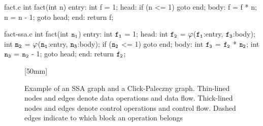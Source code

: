 \begin{filecontents*}{fact.c}
int fact(int n) {
  entry:
    int f = 1;
  head:
    if (n <= 1) goto end;
  body:
    f = f * n;
    n = n - 1;
    goto head;
  end:
    return f;
}
\end{filecontents*}

\begin{filecontents*}{fact-ssa.c}
int fact(int $\irVar{n}[1]$) {
  entry:
    int $\irVar{f}[1]$ = 1;
  head:
    int $\irVar{f}[2]$ = $\mPhi$($\irVar{f}[1]$:entry, $\irVar{f}[3]$:body);
    int $\irVar{n}[2]$ = $\mPhi$($\irVar{n}[1]$:entry, $\irVar{n}[3]$:body);
    if ($\irVar{n}[2]$ <= 1) goto end;
  body:
    int $\irVar{f}[3]$ = $\irVar{f}[2]$ * $\irVar{n}[2]$;
    int $\irVar{n}[3]$ = $\irVar{n}[2]$ - 1;
    goto head;
  end:
    return $\irVar{f}[2]$;
}
\end{filecontents*}

\begin{figure}
  \centering%
  \mbox{}%
  \hfill%
                [50mm]%
                {}%
  \hfill%
                {}%
  \hfill%
  \mbox{}

  \vspace*{\betweensubfigures}

                {%
                }

  \vspace*{\betweensubfigures}


  \caption[%
            Example of an SSA graph and a Click-Paleczny graph%
          ]%
          {%
            Example of an SSA graph and a Click-Paleczny graph.
            Thin-lined nodes and edges denote data operations and data flow.
            Thick-lined nodes and edges denote control operations and control
            flow.
            Dashed edges indicate to which block an operation belongs%
          }
\end{figure}

